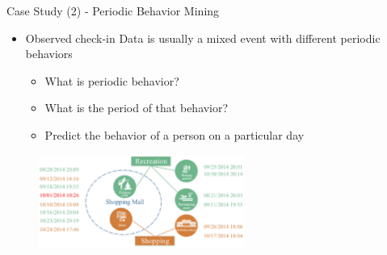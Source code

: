 \documentclass[
 size=14pt,
 paper=smartboard,  %
 mode=present, 		%
 display=slides, 	%
 style=tuliplab,  	%
 pauseslide,
 fleqn,leqno]{powerdot}{}
\begin{document}
\begin{slide}[toc=,bm=]{Case Study (2) - Periodic Behavior Mining}

\begin{itemize}
\item
Observed check-in Data is usually a mixed event with different periodic behaviors

\begin{itemize}
\item
What is periodic behavior?

\item
What is the period of that behavior?

\item
Predict the behavior of a person on a particular day
\end{itemize}
\end{itemize}

\begin{figure}[htbp]
    \centering
    \includegraphics[width=0.6\textwidth]{figures//theme1//Theme1_18.eps}
\end{figure}



\end{slide}
\end{document}
